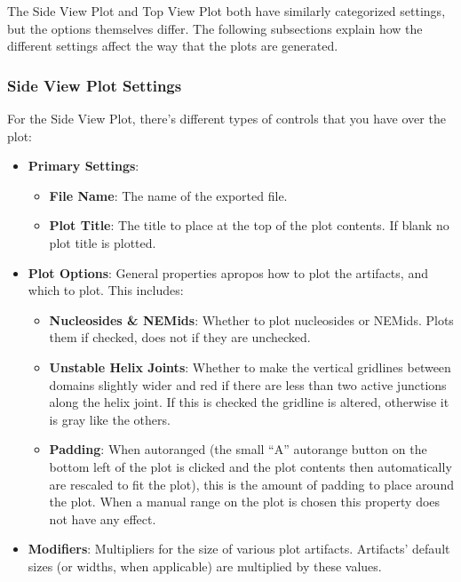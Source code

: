 \documentclass[titlepage]{article}
\begin{document}
The Side View Plot and Top View Plot both have similarly categorized settings, but the options themselves differ. The following subsections explain how the different settings affect the way that the plots are generated.

\subsubsection{Side View Plot Settings}

For the Side View Plot, there's different types of controls that you have over the plot:

\begin{itemize}
	\item \textbf{Primary Settings}: 
	\begin{itemize}
		\item \textbf{File Name}: The name of the exported file.
		\item \textbf{Plot Title}: The title to place at the top of the plot contents. If blank no plot title is plotted.
	\end{itemize}
	
	\item \textbf{Plot Options}: General properties apropos how to plot the artifacts, and which to plot. This includes:
	\begin{itemize}
		\item \textbf{Nucleosides \& NEMids}: Whether to plot nucleosides or NEMids. Plots them if checked, does not if they are unchecked.
		
		\item \textbf{Unstable Helix Joints}: Whether to make the vertical gridlines between domains slightly wider and red if there are less than two active junctions along the helix joint. If this is checked the gridline is altered, otherwise it is gray like the others.
		
		\item \textbf{Padding}: When autoranged (the small ``A'' autorange button on the bottom left of the plot is clicked and the plot contents then automatically are rescaled to fit the plot), this is the amount of padding to place around the plot. When a manual range on the plot is chosen this property does not have any effect.
	\end{itemize}
	
	\item \textbf{Modifiers}: Multipliers for the size of various plot artifacts. Artifacts' default sizes (or widths, when applicable) are multiplied by these values.
\end{itemize}
\end{document}
